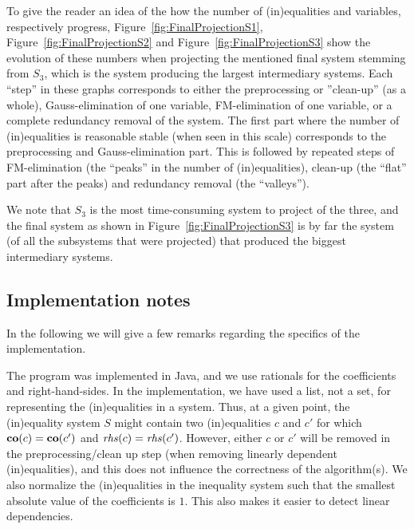 To give the reader an idea of the how the number of (in)equalities and variables, respectively progress, Figure~\ref{fig:FinalProjectionS1}, Figure~\ref{fig:FinalProjectionS2} and Figure~\ref{fig:FinalProjectionS3} show the evolution of these numbers when projecting the mentioned final system stemming from $S_3$, which is the system producing the largest intermediary systems. Each ``step'' in these graphs corresponds to either the preprocessing or ''clean-up'' (as a whole), Gauss-elimination of one variable, FM-elimination of one variable, or a complete redundancy removal of the system. The first part where the number of (in)equalities is reasonable stable (when seen in this scale) corresponds to the preprocessing and Gauss-elimination part. 
This is followed by repeated steps of FM-elimination (the ``peaks'' in the number of (in)equalities), clean-up (the ``flat'' part after the peaks) and redundancy removal (the ``valleys'').

We note that $S_3$ is the most time-consuming system to project of the three, and the final system as shown in Figure~\ref{fig:FinalProjectionS3} is by far the system (of all the subsystems that were projected) that produced the biggest intermediary systems.  

\subsection{Implementation notes}
In the following we will give a few remarks regarding the specifics of the implementation.

The program was implemented in Java, and we use rationals for the coefficients and right-hand-sides.
In the implementation, we have used a list, not a set, for representing the (in)equalities in a system. Thus, at a given point, the (in)equality system $S$ might contain two (in)equalities $c$ and $c'$ for which $\mathbf{co}(c)=\mathbf{co}(c')$ and $\mathit{rhs}(c)=\mathit{rhs}(c')$. However, either $c$ or $c'$ will be removed in the preprocessing/clean up step (when removing linearly dependent (in)equalities), and this does not influence the correctness of the algorithm(s).
We also normalize the (in)equalities in the inequality system such that the smallest absolute value of the coefficients is $1$. This also makes it easier to detect linear dependencies. 

